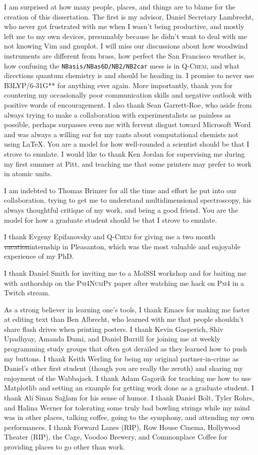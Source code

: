 \documentclass[%
  class = article,%
  crop = false,%
  float = true,%
  multi = true,%
  preview = false,%
]{standalone}
\begin{document}
I am surprised at how many people, places, and things are to blame for the creation of this dissertation. The first is my advisor, Daniel Secretary Lambrecht, who never got frustrated with me when I wasn't being productive, and mostly left me to my own devices, presumably because he didn't want to deal with me not knowing Vim and gnuplot. I will miss our discussions about how woodwind instruments are different from brass, how perfect the San Francisco weather is, how confusing the \texttt{NBasis/NBas6D/NB2/NB2car} mess is in \textsc{Q-Chem}, and what directions quantum chemistry is and should be heading in. I promise to never use B3LYP/6-31G** for anything ever again. More importantly, thank you for countering my occasionally poor communication skills and negative outlook with positive words of encouragement. I also thank Sean Garrett-Roe, who aside from always trying to make a collaboration with experimentalists as painless as possible, perhaps surpasses even me with fervent disgust toward Microsoft Word and was always a willing ear for my rants about computational chemists not using \LaTeX{}. You are a model for how well-rounded a scientist should be that I strove to emulate. I would like to thank Ken Jordan for supervising me during my first summer at Pitt, and teaching me that some printers may prefer to work in atomic units.

I am indebted to Thomas Brinzer for all the time and effort he put into our collaboration, trying to get me to understand multidimensional spectroscopy, his always thoughtful critique of my work, and being a good friend. You are the model for how a graduate student should be that I strove to emulate.

I thank Evgeny Epifanovsky and \textsc{Q-Chem} for giving me a two month \st{vacation}internship in Pleasanton, which was the most valuable and enjoyable experience of my PhD.

I thank Daniel Smith for inviting me to a MolSSI workshop and for baiting me with authorship on the \textsc{Psi4NumPy} paper after watching me hack on \textsc{Psi4} in a Twitch stream.

As a strong believer in learning one's tools, I thank Emacs for making me faster at editing text than Ben Albrecht, who learned with me that people shouldn't share flash drives when printing posters. I thank Kevin Gasperich, Shiv Upadhyay, Amanda Dumi, and Daniel Burrill for joining me at weekly programming study groups that often got derailed as they learned how to push my buttons. I thank Keith Werling for being my original partner-in-crime as Daniel's other first student (though you are really the zeroth) and sharing my enjoyment of the Wabbajack. I thank Adam Gagorik for teaching me how to use Matplotlib and setting an example for getting work done as a graduate student. I thank Ali Sinan Sa{\u{g}}lam for his sense of humor. I thank Daniel Bolt, Tyler Rohrs, and Halina Werner for tolerating some truly bad bowling strings while my mind was in other places, talking coffee, going to the symphony, and attending my own performances. I thank Forward Lanes (RIP), Row House Cinema, Hollywood Theater (RIP), the Cage, Voodoo Brewery, and Commonplace Coffee for providing places to go other than work.
\end{document}
